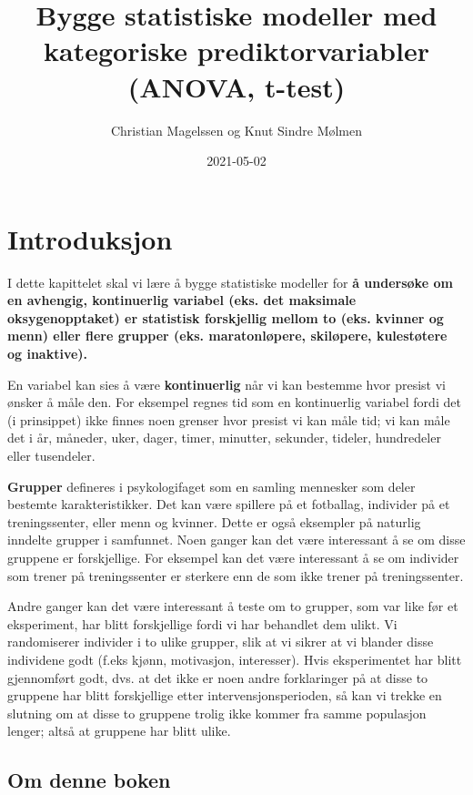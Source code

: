 \documentclass[
]{book}
\title{Bygge statistiske modeller med kategoriske prediktorvariabler (ANOVA, t-test)}
\author{Christian Magelssen og Knut Sindre Mølmen}
\date{2021-05-02}
\begin{document}
\maketitle

{
\setcounter{tocdepth}{1}
\tableofcontents
}
\hypertarget{intro}{%
\chapter{Introduksjon}\label{intro}}

I dette kapittelet skal vi lære å bygge statistiske modeller for \textbf{å undersøke om en avhengig, kontinuerlig variabel (eks. det maksimale oksygenopptaket) er statistisk forskjellig mellom to (eks. kvinner og menn) eller flere grupper (eks. maratonløpere, skiløpere, kulestøtere og inaktive).}

En variabel kan sies å være \textbf{kontinuerlig} når vi kan bestemme hvor presist vi ønsker å måle den. For eksempel regnes tid som en kontinuerlig variabel fordi det (i prinsippet) ikke finnes noen grenser hvor presist vi kan måle tid; vi kan måle det i år, måneder, uker, dager, timer, minutter, sekunder, tideler, hundredeler eller tusendeler.

\textbf{Grupper} defineres i psykologifaget som en samling mennesker som deler bestemte karakteristikker. Det kan være spillere på et fotballag, individer på et treningssenter, eller menn og kvinner. Dette er også eksempler på naturlig inndelte grupper i samfunnet. Noen ganger kan det være interessant å se om disse gruppene er forskjellige. For eksempel kan det være interessant å se om individer som trener på treningssenter er sterkere enn de som ikke trener på treningssenter.

Andre ganger kan det være interessant å teste om to grupper, som var like før et eksperiment, har blitt forskjellige fordi vi har behandlet dem ulikt. Vi randomiserer individer i to ulike grupper, slik at vi sikrer at vi blander disse individene godt (f.eks kjønn, motivasjon, interesser). Hvis eksperimentet har blitt gjennomført godt, dvs. at det ikke er noen andre forklaringer på at disse to gruppene har blitt forskjellige etter intervensjonsperioden, så kan vi trekke en slutning om at disse to gruppene trolig ikke kommer fra samme populasjon lenger; altså at gruppene har blitt ulike.

\hypertarget{om-denne-boken}{%
\section{Om denne boken}\label{om-denne-boken}}
\end{document}
